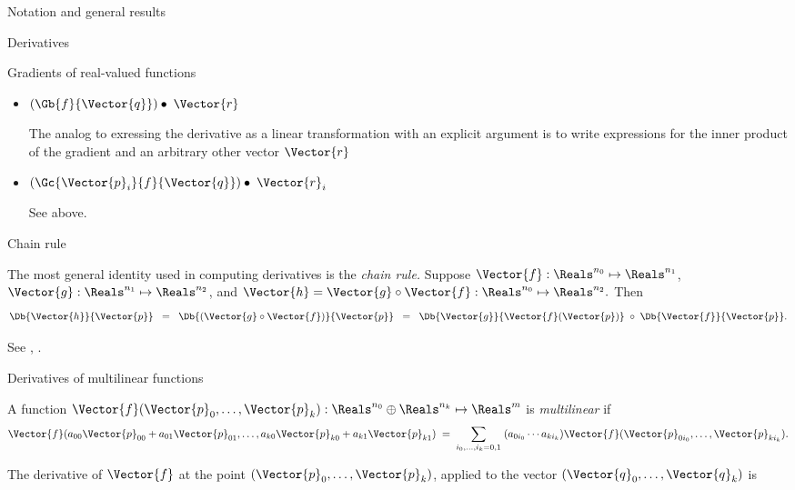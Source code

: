 \begin{plSection}{Notation and general results}
\begin{plSection}{Derivatives}
\begin{plSection}{Gradients of real-valued functions}
\begin{itemize}
\item $(\Gb{f}{\Vector{q}}) \bullet \; \Vector{r}$

The analog to exressing the derivative as a linear transformation
with an explicit argument is to write expressions for
the inner product of the gradient and an arbitrary other vector $\Vector{r}$

\item $(\Gc{\Vector{p}_i}{f}{\Vector{q}}) \bullet \;\Vector{r}_i$

See above.

\end{itemize}

\end{plSection}%
\begin{plSection}{Chain rule}
\label{sec:chain}

The most general identity used in computing derivatives is the {\it chain rule.}
Suppose
$\Vector{f}:\Reals^{n_0} \mapsto \Reals^{n_1}$,
$\Vector{g}:\Reals^{n_1} \mapsto \Reals^{n_2}$,
and
$\Vector{h} = \Vector{g} \circ \Vector{f} : \Reals^{n_0} \mapsto \Reals^{n_2}.$
Then
\begin{equation}
\label{eq:chain-rule}
\Db{\Vector{h}}{\Vector{p}} \;\; = \;\; \Db{(\Vector{g} \circ \Vector{f})}{\Vector{p}}
            \;\; = \;\; \Db{\Vector{g}}{\Vector{f}(\Vector{p})} \; \circ \; \Db{\Vector{f}} {\Vector{p}}.
\end{equation}

See , .

\end{plSection}%
\begin{plSection}{Derivatives of multilinear functions}
\label{sec:multilinear}

A function $\Vector{f}(\Vector{p}_0,\ldots,\Vector{p}_k):\Reals^{n_0} \oplus \Reals^{n_k} \mapsto \Reals^m$
is {\it multilinear} if
\begin{equation}
\Vector{f}(a_{00} \Vector{p}_{00} + a_{01} \Vector{p}_{01}, \ldots, a_{k0} \Vector{p}_{k0} + a_{k1} \Vector{p}_{k1})
\; = \; \sum_{i_0,\ldots,i_k = 0,1} \;(a_{0i_0} \cdots a_{ki_k}) \Vector{f}(\Vector{p}_{0i_0}, \ldots, \Vector{p}_{ki_k}).
\end{equation}

The derivative of $\Vector{f}$
at the point $(\Vector{p}_0,\ldots,\Vector{p}_k)$, applied to the vector $(\Vector{q}_0,\ldots,\Vector{q}_k)$ is


\end{plSection}
\end{plSection}
\end{plSection}
